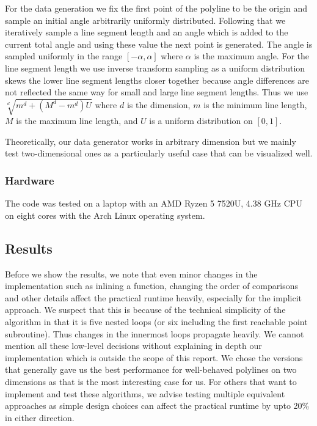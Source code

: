 For the data generation we fix the first point of the polyline to be the origin and sample an initial angle arbitrarily uniformly distributed. Following that we iteratively sample a line segment length and an angle which is added to the current total angle and using these value the next point is generated. The angle is sampled uniformly in the range \([-\alpha, \alpha]\) where \(\alpha\) is the maximum angle. For the line segment length we use inverse transform sampling as a uniform distribution skews the lower line segment lengths closer together because angle differences are not reflected the same way for small and large line segment lengths. Thus we use \(\sqrt[d]{m^d + (M^d - m^d) U}\) where \(d\) is the dimension, \(m\) is the minimum line length, \(M\) is the maximum line length, and \(U\) is a uniform distribution on \([0,1]\).

Theoretically, our data generator works in arbitrary dimension but we mainly test two-dimensional ones as a particularly useful case that can be visualized well. 

\subsubsection{Hardware}
\label{subsubsec:hardware}
The code was tested on a laptop with an AMD Ryzen 5 7520U, 4.38 GHz CPU on eight cores with the Arch Linux operating system.


\subsection{Results}
\label{subsec:results}
Before we show the results, we note that even minor changes in the implementation such as inlining a function, changing the order of comparisons and other details affect the practical runtime heavily, especially for the implicit approach. We suspect that this is because of the technical simplicity of the algorithm in that it is five nested loops (or six including the first reachable point subroutine). Thus changes in the innermost loops propagate heavily. We cannot mention all these low-level decisions without explaining in depth our implementation which is outside the scope of this report. We chose the versions that generally gave us the best performance for well-behaved polylines on two dimensions as that is the most interesting case for us. For others that want to implement and test these algorithms, we advise testing multiple equivalent approaches as simple design choices can affect the practical runtime by upto 20\% in either direction. 

